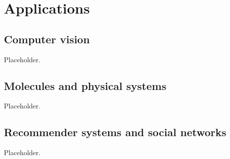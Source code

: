 \chapter{Applications}
\label{ch:applications}

\section{Computer vision}
Placeholder.

\section{Molecules and physical systems}
Placeholder.

\section{Recommender systems and social networks}
Placeholder.
